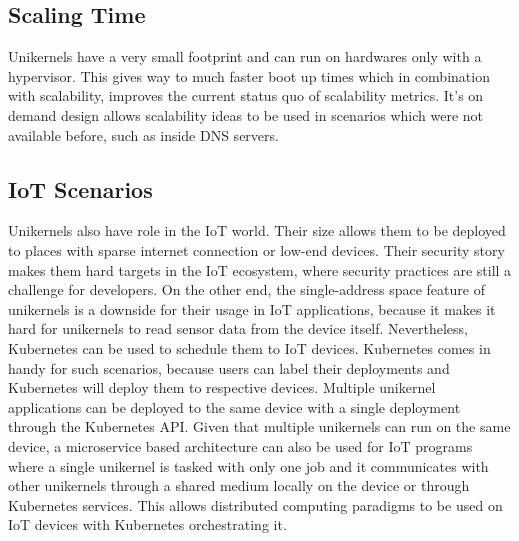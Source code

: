 \subsection{Scaling Time}
Unikernels have a very small footprint and can run on hardwares only with a hypervisor. This gives way to much faster boot up times which in combination with scalability, improves the current status quo of scalability metrics. It's on demand design allows scalability ideas to be used in scenarios which were not available before, such as inside DNS servers.

\subsection{IoT Scenarios}
Unikernels also have role in the IoT world. Their size allows them to be deployed to places with sparse internet connection or low-end devices. Their security story makes them hard targets in the IoT ecosystem, where security practices are still a challenge for developers. \cite{iot-sec} On the other end, the single-address space feature of unikernels is a downside for their usage in IoT applications, because it makes it hard for unikernels to read sensor data from the device itself. Nevertheless, Kubernetes can be used to schedule them to IoT devices. Kubernetes comes in handy for such scenarios, because users can label their deployments and Kubernetes will deploy them to respective devices. Multiple unikernel applications can be deployed to the same device with a single deployment through the Kubernetes API. Given that multiple unikernels can run on the same device, a microservice based architecture can also be used for IoT programs where a single unikernel is tasked with only one job and it communicates with other unikernels through a shared medium locally on the device or through Kubernetes services. This allows distributed computing paradigms to be used on IoT devices with Kubernetes orchestrating it.

